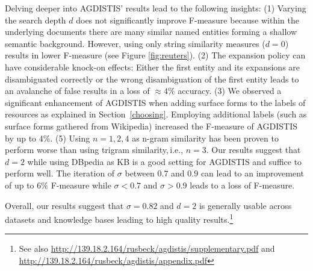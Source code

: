 \documentclass{llncs}
\begin{document}
Delving deeper into AGDISTIS' results lead to the following insights:
(1) Varying the search depth $d$ does not significantly improve \mbox{F-measure} because within the underlying documents there are many similar named entities forming a shallow semantic background. However, using only string similarity measures ($d=0$) results in lower F-measure (see Figure \ref{fig:reuters}). %
(2) The expansion policy can have considerable knock-on effects: Either the first entity and its expansions are disambiguated correctly or the wrong disambiguation of the first entity leads to an avalanche of false results in a loss of $\approx 4\%$ accuracy.
(3) We observed a significant enhancement of AGDISTIS when adding surface forms to the labels of resources as explained in Section~\ref{choosing}.
Employing additional labels (such as surface forms gathered from Wikipedia) increased the \mbox{F-measure} of AGDISTIS by up to $4\%$. 
(5) Using $n=1,2,4$ as n-gram similarity has been proven to perform worse than using trigram similarity,\,i.e., $n=3$.
Our results suggest that $d=2$ while using DBpedia as KB is a good setting for AGDISTIS and suffice to perform well. 
The iteration of $\sigma$ between $0.7$ and $0.9$ can lead to an improvement of up to $6\%$ \mbox{F-measure} while $\sigma<0.7$ and $\sigma>0.9$ leads to a loss of F-measure.

Overall, our results suggest that $\sigma=0.82$ and $d=2$ is generally usable across datasets and knowledge bases leading to high quality results.\footnote{See also \url{http://139.18.2.164/rusbeck/agdistis/supplementary.pdf} and \url{http://139.18.2.164/rusbeck/agdistis/appendix.pdf}}

\end{document}
